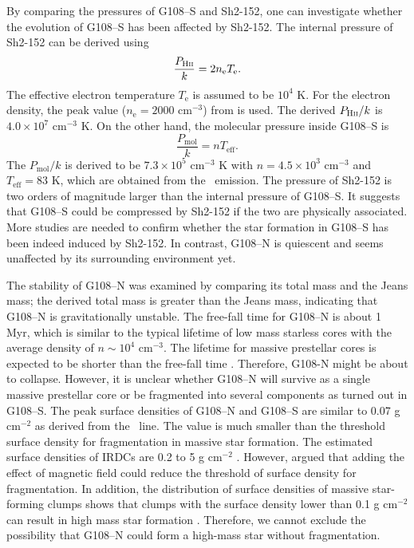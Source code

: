 \documentclass[manuscript]{aastex}
\begin{document}
By comparing the pressures of G108--S and Sh2-152, one can investigate whether the evolution of G108--S has been affected by Sh2-152.
The internal pressure of Sh2-152 can be derived using \citep{morgan04}
\begin{equation}
\frac{P_{\textrm{H{\sc ii}}}}{k}= 2n_{\textrm{e}}T_{\textrm{e}}.
\end{equation}
The effective electron temperature $T_\textrm{e}$ is assumed to be $10^4$ K.
For the electron density, the peak value ($n_\textrm{e}=2000$ cm$^{-3}$) from \citet{heydari81} is used. 
The derived $P_{\textrm{H{\sc ii}}}/k$ is $4.0\times 10^7$ cm$^{-3}$ K.
On the other hand, the molecular pressure inside G108--S is \citep{liu12a}
\begin{equation}
\frac{P_{\textrm{mol}}}{k}=nT_{\textrm{eff}}.
\end{equation}
The $P_{\textrm{mol}}/k$ is derived to be $7.3\times 10^5$ cm$^{-3}$ K with $n=4.5\times10^3$ cm$^{-3}$ and $T_\textrm{eff}=83$ K, which are obtained from the \ceot\ emission.
The pressure of Sh2-152 is two orders of magnitude larger than the internal pressure of G108--S.
It suggests that G108--S could be compressed by Sh2-152 if the two are physically associated.
More studies are needed to confirm whether the star formation in G108--S has been indeed induced by Sh2-152. 
In contrast, G108--N is quiescent and seems unaffected by its surrounding environment yet. 


The stability of G108--N was examined by comparing its total mass and the Jeans mass; the derived total mass is greater than the Jeans mass, indicating that G108--N is gravitationally unstable. 
The free-fall time \citep[$t_{\textrm{ff}}=3.4\times10^7 n^{-0.5}$ yr,][]{evans99} for G108--N is about 1 Myr, which is similar to the typical lifetime of low mass starless cores with the average density of $n\sim10^{4}$ cm$^{-3}$.
The lifetime for massive prestellar cores is expected to be shorter than the free-fall time \citep{andre14}.
Therefore, G108-N might be about to collapse.
However, it is unclear whether G108--N will survive as a single massive prestellar core or be fragmented into several components as turned out in G108--S.
The peak surface densities of G108--N and G108--S are similar to 0.07 g cm$^{-2}$ as derived from the \ceo\ line.
The value is much smaller than the threshold surface density \citep[1 g cm$^{-2}$,][]{krumholz08} for fragmentation in massive star formation.
The estimated surface densities of IRDCs are 0.2 to 5 g cm$^{-2}$ \citep{battersby11}.
However, \citet{urquhart14} argued that adding the effect of magnetic field could reduce the threshold of surface density for fragmentation.
In addition, the distribution of surface densities of massive star-forming clumps shows that clumps with the surface density lower than 0.1 g cm$^{-2}$ can result in high mass star formation \citep[Figure 12 of][]{urquhart14}. 
Therefore, we cannot exclude the possibility that G108--N could form a high-mass star without fragmentation.
\end{document}

